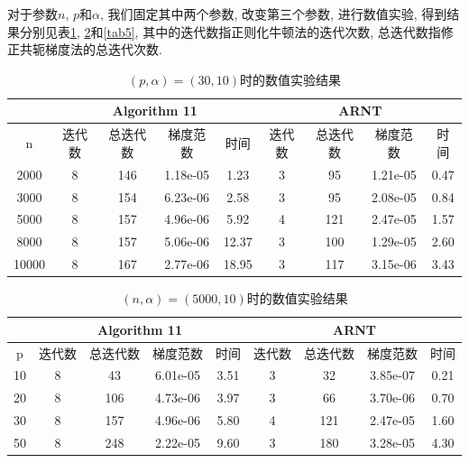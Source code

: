 \documentclass[UTF8]{ctexart}
\begin{document}
对于参数$n$, $p$和$\alpha$, 我们固定其中两个参数, 改变第三个参数, 进行数值实验, 得到结果分别见表\ref{tab3}, \ref{tab4}和\ref{tab5}, 其中的迭代数指正则化牛顿法的迭代次数, 总迭代数指修正共轭梯度法的总迭代次数.  

\begin{table}[htb]
    \centering
    \begin{tabular}{|c|cccc|cccc|}
        \hline
         & \multicolumn{4}{|c|}{Algorithm 11} & \multicolumn{4}{|c|}{ARNT}\\
        \hline
        n & 迭代数 & 总迭代数 & 梯度范数 & 时间 & 迭代数 & 总迭代数 & 梯度范数 & 时间\\
        \hline
        2000 & 8 & 146 & 1.18e-05 & 1.23 & 3 & 95 & 1.21e-05 & 0.47 \\
        \hline
        3000 & 8 & 154 & 6.23e-06 & 2.58 & 3 & 95 & 2.08e-05 & 0.84 \\
        \hline 
        5000 & 8 & 157 & 4.96e-06 & 5.92 & 4 & 121 & 2.47e-05 & 1.57 \\
        \hline
        8000 & 8 & 157 & 5.06e-06 & 12.37 & 3 & 100 & 1.29e-05 & 2.60 \\
        \hline 
        10000 & 8 & 167 & 2.77e-06 & 18.95 & 3 & 117 & 3.15e-06 & 3.43 \\
        \hline
    \end{tabular}
    \caption{$(p,\alpha)=(30,10)$时的数值实验结果}\label{tab3}
\end{table}

\begin{table}[htb]
    \centering
    \begin{tabular}{|c|cccc|cccc|}
        \hline
         & \multicolumn{4}{|c|}{Algorithm 11} & \multicolumn{4}{|c|}{ARNT}\\
        \hline
        p & 迭代数 & 总迭代数 & 梯度范数 & 时间 & 迭代数 & 总迭代数 & 梯度范数 & 时间\\
        \hline
        10 & 8 & 43 & 6.01e-05 & 3.51 & 3 & 32 & 3.85e-07 & 0.21 \\
        \hline
        20 & 8 & 106 & 4.73e-06 & 3.97 & 3 & 66 & 3.70e-06 & 0.70 \\
        \hline 
        30 & 8 & 157 & 4.96e-06 & 5.80 & 4 & 121 & 2.47e-05 & 1.60 \\
        \hline
        50 & 8 & 248 & 2.22e-05 & 9.60 & 3 & 180 & 3.28e-05 & 4.30 \\
        \hline 
    \end{tabular}
    \caption{$(n,\alpha)=(5000,10)$时的数值实验结果}\label{tab4}
\end{table}
\end{document}
